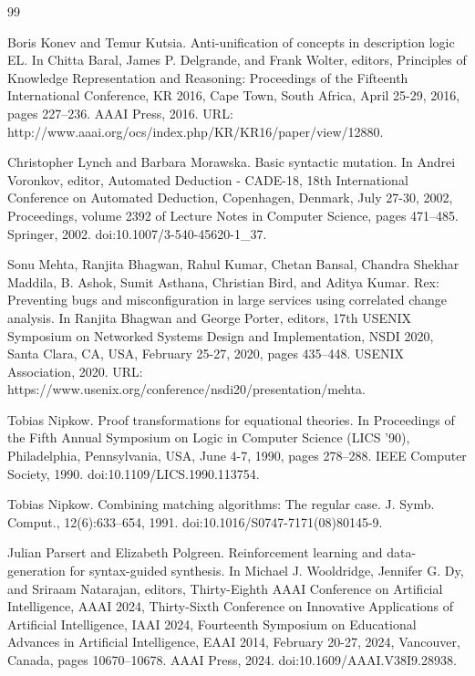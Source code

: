 \documentclass[10pt,a4paper]{amsart}
\begin{document}
\begin{thebibliography}{99}
\par\noindent  [31]  Boris Konev and Temur Kutsia.  Anti-unification of concepts in description logic EL.  In Chitta Baral, James P. Delgrande, and Frank Wolter, editors, Principles of Knowledge Representation and Reasoning: Proceedings of the Fifteenth International Conference, KR 2016, Cape Town, South Africa, April 25-29, 2016, pages 227–236. AAAI Press, 2016.  URL: http://www.aaai.org/ocs/index.php/KR/KR16/paper/view/12880.  
 
\par\noindent  [32]  Christopher Lynch and Barbara Morawska.  Basic syntactic mutation.  In Andrei Voronkov, editor, Automated Deduction - CADE-18, 18th International Conference on Automated Deduction, Copenhagen, Denmark, July 27-30, 2002, Proceedings, volume 2392 of Lecture Notes in Computer Science, pages 471–485. Springer, 2002.  doi:10.1007/3-540-45620-1\_37.  
 
\par\noindent  [33]  Sonu Mehta, Ranjita Bhagwan, Rahul Kumar, Chetan Bansal, Chandra Shekhar Maddila, B. Ashok, Sumit Asthana, Christian Bird, and Aditya Kumar.  Rex: Preventing bugs and misconfiguration in large services using correlated change analysis.  In Ranjita Bhagwan and George Porter, editors, 17th USENIX Symposium on Networked Systems Design and Implementation, NSDI 2020, Santa Clara, CA, USA, February 25-27, 2020, pages 435–448. USENIX Association, 2020.  URL: https://www.usenix.org/conference/nsdi20/presentation/mehta.  
 
\par\noindent  [34]  Tobias Nipkow.  Proof transformations for equational theories.  In Proceedings of the Fifth Annual Symposium on Logic in Computer Science (LICS ’90), Philadelphia, Pennsylvania, USA, June 4-7, 1990, pages 278–288. IEEE Computer Society, 1990.  doi:10.1109/LICS.1990.113754.  
 
\par\noindent  [35]  Tobias Nipkow.  Combining matching algorithms: The regular case.  J. Symb. Comput., 12(6):633–654, 1991.  doi:10.1016/S0747-7171(08)80145-9.  
 
\par\noindent  [36]  Julian Parsert and Elizabeth Polgreen.  Reinforcement learning and data-generation for syntax-guided synthesis.  In Michael J. Wooldridge, Jennifer G. Dy, and Sriraam Natarajan, editors, Thirty-Eighth AAAI Conference on Artificial Intelligence, AAAI 2024, Thirty-Sixth Conference on Innovative Applications of Artificial Intelligence, IAAI 2024, Fourteenth Symposium on Educational Advances in Artificial Intelligence, EAAI 2014, February 20-27, 2024, Vancouver, Canada, pages 10670–10678. AAAI Press, 2024.  doi:10.1609/AAAI.V38I9.28938.  
 

\end{thebibliography}
\end{document}
